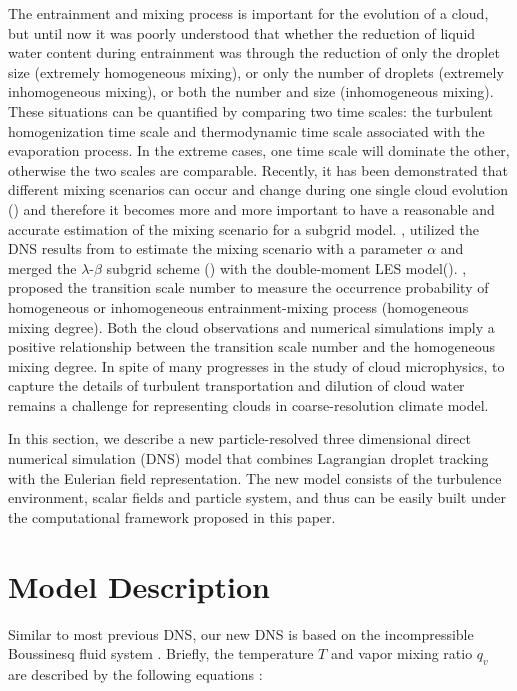 The entrainment and mixing process is important for the evolution of a cloud, but until now it was poorly understood that whether the reduction of liquid water content during entrainment was through the reduction of only the droplet size (extremely homogeneous mixing), or only the number of droplets (extremely inhomogeneous mixing), or both the number and size (inhomogeneous mixing). These situations can be quantified by comparing two time scales: the turbulent homogenization time scale and thermodynamic time scale associated with the evaporation process. In the extreme cases, one time scale will dominate the other, otherwise the two scales are comparable. Recently, it has been demonstrated that different mixing scenarios can occur and change during one single cloud evolution (\cite{Andrejczuk2009,Burnet2007Observational,Lehmann2009}) and therefore it becomes more and more important to have a reasonable and accurate estimation of the mixing scenario for a subgrid model. \cite{Jarecka2013}, utilized the DNS results from \cite{Andrejczuk2004, Andrejczuk2006, Andrejczuk2009}  to estimate the mixing scenario with a parameter $\alpha$ and merged the $\lambda$-$\beta$ subgrid scheme (\cite{Jarecka2009}) with the double-moment LES model(\cite{Morrison2008}). \cite{Lu2013}, proposed the transition scale number to measure the occurrence probability of homogeneous or inhomogeneous entrainment-mixing process (homogeneous mixing degree). Both the cloud observations and numerical simulations imply a positive relationship between the transition scale number and the homogeneous mixing degree. In spite of many progresses in the study of cloud microphysics, to capture the details of turbulent transportation and dilution of cloud water remains a challenge for representing clouds in coarse-resolution climate model.

In this section, we describe a new particle-resolved three dimensional direct numerical simulation (DNS) model that combines Lagrangian droplet tracking with the Eulerian field representation. The new model consists of the turbulence environment, scalar fields and particle system, and thus can be easily built under the computational framework proposed in this paper.

\section{Model Description}
Similar to most previous DNS, our new DNS is based on the incompressible
Boussinesq fluid system \cite{Andrejczuk2004}. Briefly, the temperature $T$ and vapor
mixing ratio $q_v$ are described by the following equations \cite{Kumar2012Cloud}:

